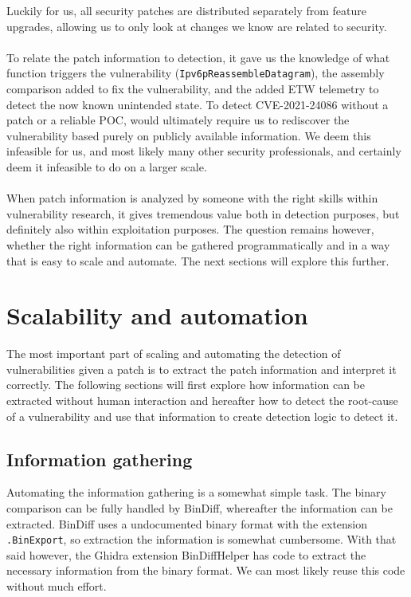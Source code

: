 \documentclass{report}
\begin{document}
Luckily for us, all security patches are distributed separately from feature upgrades, allowing us to only look at changes we know are related to security.
\\
\\
To relate the patch information to detection, it gave us the knowledge of what function triggers the vulnerability (\texttt{Ipv6pReassembleDatagram}), the assembly comparison added to fix the vulnerability, and the added \gls{ETW} telemetry to detect the now known unintended state. To detect CVE-2021-24086 without a patch or a reliable \gls{POC}, would ultimately require us to rediscover the vulnerability based purely on publicly available information. We deem this infeasible for us, and most likely many other security professionals, and certainly deem it infeasible to do on a larger scale.
\\
\\
When patch information is analyzed by someone with the right skills within vulnerability research, it gives tremendous value both in detection purposes, but definitely also within exploitation purposes. The question remains however, whether the right information can be gathered programmatically and in a way that is easy to scale and automate. The next sections will explore this further.

\section{Scalability and automation}
The most important part of scaling and automating the detection of vulnerabilities given a patch is to extract the patch information and interpret it correctly. The following sections will first explore how information can be extracted without human interaction and hereafter how to detect the root-cause of a vulnerability and use that information to create detection logic to detect it.

\subsection{Information gathering}
Automating the information gathering is a somewhat simple task. The binary comparison can be fully handled by BinDiff\cite{url:bindiff:homepage}, whereafter the information can be extracted. BinDiff uses a undocumented binary format with the extension \texttt{.BinExport}, so extraction the information is somewhat cumbersome. With that said however, the Ghidra\cite{url:ghidra:homepage} extension BinDiffHelper\cite{url:BinDiffHelper:homepage} has code to extract the necessary information from the binary format. We can most likely reuse this code without much effort.
\end{document}
